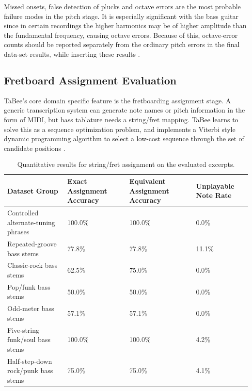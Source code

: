 \documentclass[a4paper, 12pt, titlepage]{article}
\begin{document}
Missed onsets, false detection of plucks and octave errors are the most probable failure modes in the pitch stage. It is especially significant with the bass guitar since in certain recordings the higher harmonics may be of higher amplitude than the fundamental frequency, causing octave errors. Because of this, octave-error counts should be reported separately from the ordinary pitch errors in the final data-set results, while inserting these results \cite{decheveigne2002,mauch2014}.

\subsection{Fretboard Assignment Evaluation}

TaBee's core domain specific feature is the fretboarding assignment stage. A generic transcription system can generate note names or pitch information in the form of MIDI, but bass tablature needs a string/fret mapping. TaBee learns to solve this as a sequence optimization problem, and implements a Viterbi style dynamic programming algorithm to select a low-cost sequence through the set of candidate positions \cite{sayegh1989,hori2013,skarha2018}.

\begin{table}[H]
    \centering
    \begin{tabular}{|p{}|p{}|p{}|p{}|}
        \hline
        \textbf{Dataset Group} & \textbf{Exact Assignment Accuracy} & \textbf{Equivalent Assignment Accuracy} & \textbf{Unplayable Note Rate} \\
        \hline
        Controlled alternate-tuning phrases & 100.0\% & 100.0\% & 0.0\% \\
        \hline
        Repeated-groove bass stems & 77.8\% & 77.8\% & 11.1\% \\
        \hline
        Classic-rock bass stems & 62.5\% & 75.0\% & 0.0\% \\
        \hline
        Pop/funk bass stems & 50.0\% & 50.0\% & 0.0\% \\
        \hline
        Odd-meter bass stems & 57.1\% & 57.1\% & 0.0\% \\
        \hline
        Five-string funk/soul bass stems & 100.0\% & 100.0\% & 4.2\% \\
        \hline
        Half-step-down rock/punk bass stems & 75.0\% & 75.0\% & 4.1\% \\
        \hline
    \end{tabular}
    \caption{Quantitative results for string/fret assignment on the evaluated excerpts.}
    \label{tab:tabee_fretboard_results}
\end{table}
\end{document}
